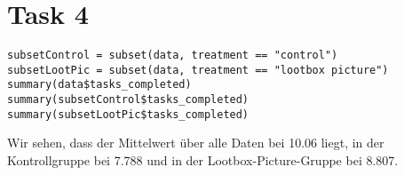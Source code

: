 \documentclass{article}
\begin{document}
	\section*{Task 4}
	\begin{lstlisting}
subsetControl = subset(data, treatment == "control")
subsetLootPic = subset(data, treatment == "lootbox picture")
summary(data$tasks_completed)
summary(subsetControl$tasks_completed)
summary(subsetLootPic$tasks_completed)
	\end{lstlisting}
	Wir sehen, dass der Mittelwert über alle Daten bei 10.06 liegt, in der Kontrollgruppe bei 7.788 und in der Lootbox-Picture-Gruppe bei 8.807.
\end{document}

